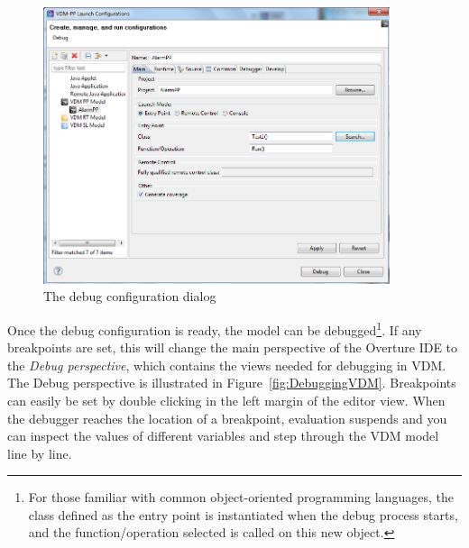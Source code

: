 \begin{figure}[htp]
\begin{center}
  \includegraphics[width=4in]{figures/debugConfiguration}
  \caption{The debug configuration dialog}
  \label{fig:debugConfiguration}
\end{center}
\end{figure}
%
Once the debug configuration is ready, the model can be debugged\footnote{For those familiar with common object-oriented programming languages, the class defined as the entry point is instantiated when the debug process starts, and the function/operation selected is called on this new object.}. If any breakpoints are set, this will change the main perspective of the Overture IDE to the \emph{Debug perspective}, which contains the views needed for debugging in VDM. The Debug perspective is illustrated in Figure~\ref{fig:DebuggingVDM}. Breakpoints can easily be set by double clicking in the left margin of the editor view. When the debugger reaches the location of a breakpoint, evaluation suspends and you can inspect the values of different variables and step through the VDM model line by line.
%

